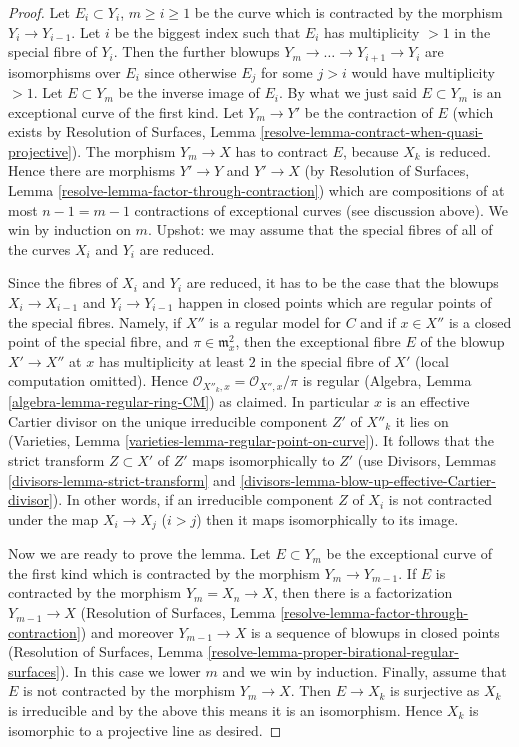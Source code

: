 \begin{proof}
\medskip\noindent
Let $E_i \subset Y_i$, $m \geq i \geq 1$ be the curve which is contracted
by the morphism $Y_i \to Y_{i - 1}$. Let $i$ be the biggest index such
that $E_i$ has multiplicity $> 1$ in the special fibre of $Y_i$.
Then the further blowups $Y_m \to \ldots \to Y_{i + 1} \to Y_i$
are isomorphisms over $E_i$ since otherwise $E_j$ for some $j > i$
would have multiplicity $> 1$. Let $E \subset Y_m$ be the inverse
image of $E_i$. By what we just said $E \subset Y_m$ is an
exceptional curve of the first kind. Let $Y_m \to Y'$ be the
contraction of $E$ (which exists by Resolution of Surfaces, Lemma
\ref{resolve-lemma-contract-when-quasi-projective}). The morphism
$Y_m \to X$ has to contract $E$, because $X_k$ is reduced.
Hence there are morphisms $Y' \to Y$ and $Y' \to X$ (by
Resolution of Surfaces, Lemma
\ref{resolve-lemma-factor-through-contraction})
which are compositions of at most $n - 1 = m - 1$ contractions
of exceptional curves (see discussion above). We win by induction on $m$.
Upshot: we may assume that the special fibres of all of
the curves $X_i$ and $Y_i$ are reduced.

\medskip\noindent
Since the fibres of $X_i$ and $Y_i$ are reduced, it has to be the
case that the blowups $X_i \to X_{i - 1}$ and $Y_i \to Y_{i - 1}$
happen in closed points which are regular points of the special fibres.
Namely, if $X''$ is a regular model for $C$ and if $x \in X''$
is a closed point of the special fibre, and
$\pi \in \mathfrak m_x^2$, then the exceptional fibre $E$ of the
blowup $X' \to X''$ at $x$ has multiplicity at least $2$ in the
special fibre of $X'$ (local computation omitted).
Hence $\mathcal{O}_{X''_k, x} = \mathcal{O}_{X'', x}/\pi$ is
regular (Algebra, Lemma \ref{algebra-lemma-regular-ring-CM}) as claimed.
In particular $x$ is an effective Cartier divisor on the unique
irreducible component $Z'$ of $X''_k$ it lies on
(Varieties, Lemma \ref{varieties-lemma-regular-point-on-curve}).
It follows that the strict transform $Z \subset X'$ of $Z'$
maps isomorphically to $Z'$
(use Divisors, Lemmas \ref{divisors-lemma-strict-transform} and
\ref{divisors-lemma-blow-up-effective-Cartier-divisor}).
In other words, if an irreducible component $Z$ of $X_i$
is not contracted under the map $X_i \to X_j$ ($i > j$)
then it maps isomorphically to its image.

\medskip\noindent
Now we are ready to prove the lemma.
Let $E \subset Y_m$ be the exceptional curve of the first kind
which is contracted by the morphism $Y_m \to Y_{m - 1}$. If $E$ is
contracted by the morphism $Y_m = X_n \to X$, then there is a factorization
$Y_{m - 1} \to X$ (Resolution of Surfaces, Lemma
\ref{resolve-lemma-factor-through-contraction})
and moreover $Y_{m - 1} \to X$ is a sequence of blowups
in closed points (Resolution of Surfaces, Lemma
\ref{resolve-lemma-proper-birational-regular-surfaces}).
In this case we lower $m$ and we win by induction.
Finally, assume that $E$ is not contracted by the morphism $Y_m \to X$.
Then $E \to X_k$ is surjective as $X_k$ is irreducible
and by the above this means it is an isomorphism.
Hence $X_k$ is isomorphic to a projective line as desired.
\end{proof}






